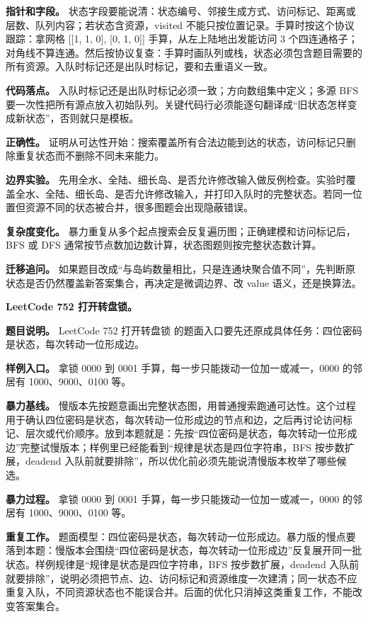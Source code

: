 \textbf{指针和字段。} 状态字段要能说清：状态编号、邻接生成方式、访问标记、距离或层数、队列内容；若状态含资源，visited 不能只按位置记录。手算时按这个协议跟踪：拿网格 [[1, 1, 0], [0, 1, 0]] 手算，从左上陆地出发能访问 3 个四连通格子；对角线不算连通。然后按协议复查：手算时画队列或栈，状态必须包含题目需要的所有资源。入队时标记还是出队时标记，要和去重语义一致。

\textbf{代码落点。} 入队时标记还是出队时标记必须一致；方向数组集中定义；多源 BFS 要一次性把所有源点放入初始队列。关键代码行必须能逐句翻译成“旧状态怎样变成新状态”，否则就只是模板。

\textbf{正确性。} 证明从可达性开始：搜索覆盖所有合法边能到达的状态，访问标记只删除重复状态而不删除不同未来能力。

\textbf{边界实验。} 先用全水、全陆、细长岛、是否允许修改输入做反例检查。实验时覆盖全水、全陆、细长岛、是否允许修改输入，并打印入队时的完整状态。若同一位置但资源不同的状态被合并，很多图题会出现隐蔽错误。

\textbf{复杂度变化。} 暴力重复从多个起点搜索会反复遍历图；正确建模和访问标记后，BFS 或 DFS 通常按节点数加边数计算，状态图题则按完整状态数计算。

\textbf{迁移追问。} 如果题目改成“与岛屿数量相比，只是连通块聚合值不同”，先判断原状态是否仍然覆盖新答案集合，再决定是微调边界、改 value 语义，还是换算法。

\noindent\textbf{LeetCode 752 打开转盘锁。}

\textbf{题目说明。} LeetCode 752 打开转盘锁 的题面入口要先还原成具体任务：四位密码是状态，每次转动一位形成边。

\textbf{样例入口。} 拿锁 0000 到 0001 手算，每一步只能拨动一位加一或减一，0000 的邻居有 1000、9000、0100 等。

\textbf{暴力基线。} 慢版本先按题意画出完整状态图，用普通搜索跑通可达性。这个过程用于确认四位密码是状态，每次转动一位形成边的节点和边，之后再讨论访问标记、层次或代价顺序。放到本题就是：先按“四位密码是状态，每次转动一位形成边”完整试慢版本；样例里已经能看到“规律是状态是四位字符串，BFS 按步数扩展，deadend 入队前就要排除”，所以优化前必须先能说清慢版本枚举了哪些候选。

\textbf{暴力过程。} 拿锁 0000 到 0001 手算，每一步只能拨动一位加一或减一，0000 的邻居有 1000、9000、0100 等。

\textbf{重复工作。} 题面模型：四位密码是状态，每次转动一位形成边。暴力版的慢点要落到本题：慢版本会围绕“四位密码是状态，每次转动一位形成边”反复展开同一批状态。样例规律是“规律是状态是四位字符串，BFS 按步数扩展，deadend 入队前就要排除”，说明必须把节点、边、访问标记和资源维度一次建清；同一状态不应重复入队，不同资源状态也不能误合并。后面的优化只消掉这类重复工作，不能改变答案集合。

